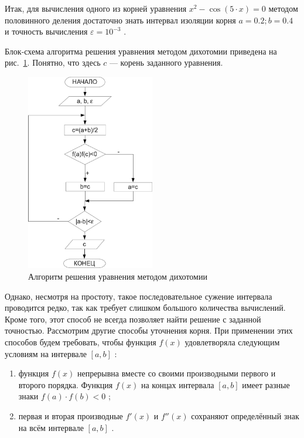 Итак, для вычисления одного из корней уравнения  $x^2-\cos (5\cdot x)=0$  методом половинного деления достаточно знать
интервал изоляции корня  $a=0.2;b=0.4$  и точность вычисления  $\varepsilon=10^{-3}$ . 

Блок-схема алгоритма решения уравнения методом дихотомии приведена на рис.~\ref{ch04:refDrawing3}. 
Понятно, что здесь  $c$  --- корень заданного уравнения.

\begin{figure}[htb]
\begin{center}
\includegraphics[width=0.5\textwidth]{img/ris_4_4}
\caption{Алгоритм решения уравнения методом дихотомии}
\label{ch04:refDrawing3}
\end{center}
\end{figure}

Однако, несмотря на простоту, такое последовательное сужение интервала проводится редко, так как требует слишком
большого количества вычислений. Кроме того, этот способ не всегда позволяет найти решение с заданной точностью.
Рассмотрим другие способы уточнения корня. При применении этих способов будем требовать, чтобы функция  $f(x)$ 
удовлетворяла следующим условиям на интервале  $[a,b]$ :
\begin{enumerate}
\item функция  $f(x)$  непрерывна вместе со своими производными первого и второго порядка. Функция  $f(x)$  на концах
интервала  $[a,b]$  имеет разные знаки  $f(a)\cdot f(b)<0$ ;
\item первая и вторая производные  $f'(x)$  и  $f''(x)$ сохраняют определённый
знак на всём интервале  $[a,b]$ .
\end{enumerate}

